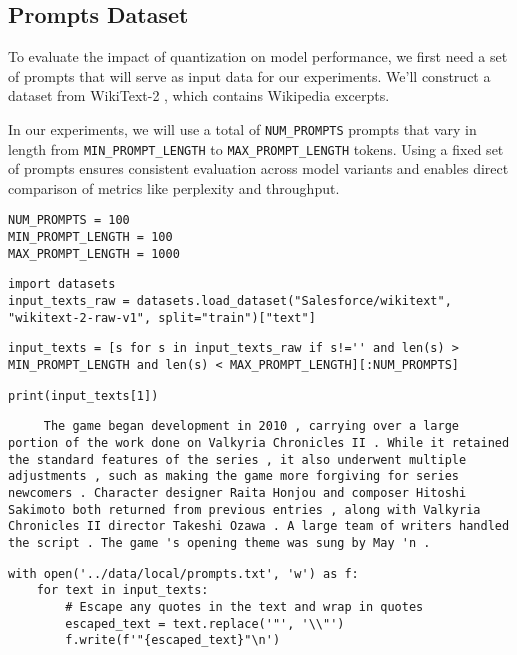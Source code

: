 \subsection{Prompts Dataset}

To evaluate the impact of quantization on model performance, we first need a set of prompts that will serve as input data for our experiments. We'll construct a dataset from WikiText-2 , which contains Wikipedia excerpts.

In our experiments, we will use a total of \texttt{NUM\_PROMPTS} prompts that vary in length from \texttt{MIN\_PROMPT\_LENGTH} to \texttt{MAX\_PROMPT\_LENGTH} tokens. Using a fixed set of prompts ensures consistent evaluation across model variants and enables direct comparison of metrics like perplexity and throughput.

\begin{verbatim}
NUM_PROMPTS = 100
MIN_PROMPT_LENGTH = 100
MAX_PROMPT_LENGTH = 1000
\end{verbatim}

\begin{verbatim}
import datasets
input_texts_raw = datasets.load_dataset("Salesforce/wikitext", "wikitext-2-raw-v1", split="train")["text"]
\end{verbatim}

\begin{verbatim}
input_texts = [s for s in input_texts_raw if s!='' and len(s) > MIN_PROMPT_LENGTH and len(s) < MAX_PROMPT_LENGTH][:NUM_PROMPTS]
\end{verbatim}

\begin{verbatim}
print(input_texts[1])
\end{verbatim}

\begin{verbatim}
     The game began development in 2010 , carrying over a large portion of the work done on Valkyria Chronicles II . While it retained the standard features of the series , it also underwent multiple adjustments , such as making the game more forgiving for series newcomers . Character designer Raita Honjou and composer Hitoshi Sakimoto both returned from previous entries , along with Valkyria Chronicles II director Takeshi Ozawa . A large team of writers handled the script . The game 's opening theme was sung by May 'n . 
\end{verbatim}

\begin{verbatim}
with open('../data/local/prompts.txt', 'w') as f:
    for text in input_texts:
        # Escape any quotes in the text and wrap in quotes
        escaped_text = text.replace('"', '\\"')
        f.write(f'"{escaped_text}"\n')
\end{verbatim}


